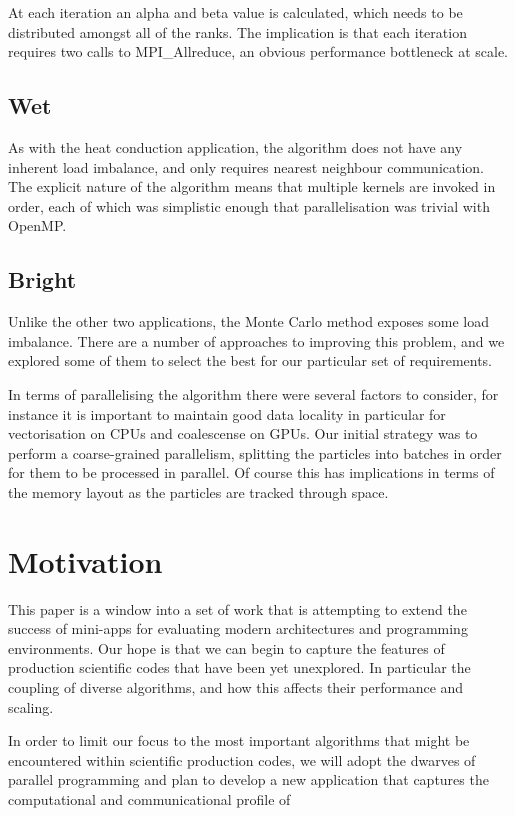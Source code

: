 \documentclass[runningheads,a4paper]{llncs}
\begin{document}
At each iteration an alpha and beta value is calculated, which needs to be distributed amongst all of the ranks. The implication is that each iteration requires two calls to MPI\_Allreduce, an obvious performance bottleneck at scale. 

\subsection{Wet}

As with the heat conduction application, the algorithm does not have any inherent load imbalance, and only requires nearest neighbour communication. The explicit nature of the algorithm means that multiple kernels are invoked in order, each of which was simplistic enough that parallelisation was trivial with OpenMP.

\subsection{Bright}

Unlike the other two applications, the Monte Carlo method exposes some load imbalance. There are a number of approaches to improving this problem, and we explored some of them to select the best for our particular set of requirements. 

In terms of parallelising the algorithm there were several factors to consider, for instance it is important to maintain good data locality in particular for vectorisation on CPUs and coalescense on GPUs. Our initial strategy was to perform a coarse-grained parallelism, splitting the particles into batches in order for them to be processed in parallel. Of course this has implications in terms of the memory layout as the particles are tracked through space.

\section{Motivation}

This paper is a window into a set of work that is attempting to extend the success of mini-apps for evaluating modern architectures and programming environments. Our hope is that we can begin to capture the features of production scientific codes that have been yet unexplored. In particular the coupling of diverse algorithms, and how this affects their performance and scaling.

In order to limit our focus to the most important algorithms that might be encountered within scientific production codes, we will adopt the dwarves of parallel programming and plan to develop a new application that captures the computational and communicational profile of  
\end{document}
